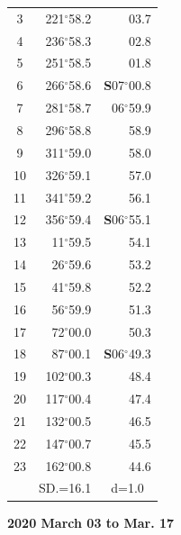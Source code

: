 \documentclass[10pt, a4paper]{report}
\begin{document}
\begin{scriptsize}
\begin{tabular*}{0.2\textwidth}[t]{@{\extracolsep{\fill}}|c|rr|}
3 & 221$^\circ$58.2 & \raisebox{0.24ex}{\boldmath$\cdot$~\boldmath$\cdot$~~}03.7\\
4 & 236$^\circ$58.3 & 02.8\\
5 & 251$^\circ$58.5 & 01.8\\[2Pt]
6 & 266$^\circ$58.6 & \textbf{S}07$^\circ$00.8\\
7 & 281$^\circ$58.7 & 06$^\circ$59.9\\
8 & 296$^\circ$58.8 & 58.9\\
9 & 311$^\circ$59.0 & \raisebox{0.24ex}{\boldmath$\cdot$~\boldmath$\cdot$~~}58.0\\
10 & 326$^\circ$59.1 & 57.0\\
11 & 341$^\circ$59.2 & 56.1\\[2Pt]
12 & 356$^\circ$59.4 & \textbf{S}06$^\circ$55.1\\
13 & 11$^\circ$59.5 & 54.1\\
14 & 26$^\circ$59.6 & 53.2\\
15 & 41$^\circ$59.8 & \raisebox{0.24ex}{\boldmath$\cdot$~\boldmath$\cdot$~~}52.2\\
16 & 56$^\circ$59.9 & 51.3\\
17 & 72$^\circ$00.0 & 50.3\\[2Pt]
18 & 87$^\circ$00.1 & \textbf{S}06$^\circ$49.3\\
19 & 102$^\circ$00.3 & 48.4\\
20 & 117$^\circ$00.4 & 47.4\\
21 & 132$^\circ$00.5 & \raisebox{0.24ex}{\boldmath$\cdot$~\boldmath$\cdot$~~}46.5\\
22 & 147$^\circ$00.7 & 45.5\\
23 & 162$^\circ$00.8 & 44.6\\
\hline
\rule{0pt}{2.4ex} & \multicolumn{1}{c}{SD.=16.1} & \multicolumn{1}{c|}{d=1.0}\\
\hline
\end{tabular*}

\end{scriptsize}
\newpage
\sffamily
\noindent
\begin{flushright}
\textbf{2020 March 03 to Mar. 17}\par
\end{flushright}
\end{document}
